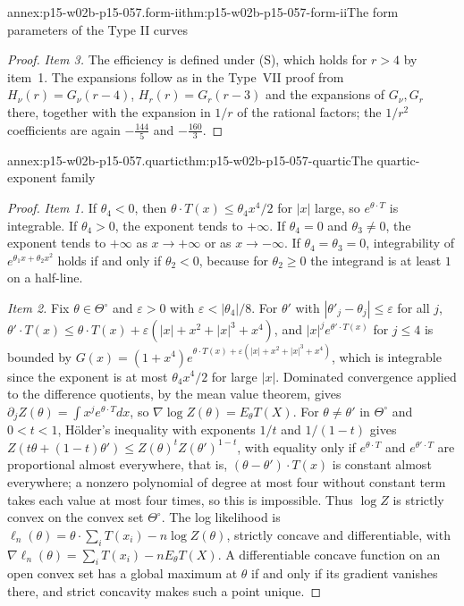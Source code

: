 \begin{annexitem}{annex:p15-w02b-p15-057.form-ii}{thm:p15-w02b-p15-057-form-ii}{The form parameters of the Type II curves}
\begin{proof}
\emph{Item 3.} The efficiency is defined under (S), which holds for
\(r>4\) by item~1. The expansions follow as in the Type~VII proof from
\(H_\nu(r)=G_\nu(r-4)\), \(H_r(r)=G_r(r-3)\) and the expansions of
\(G_\nu,G_r\) there, together with the expansion in \(1/r\) of the
rational factors; the \(1/r^2\) coefficients are again \(-\frac{144}5\)
and \(-\frac{160}3\).
\end{proof}
\end{annexitem}

\begin{annexitem}{annex:p15-w02b-p15-057.quartic}{thm:p15-w02b-p15-057-quartic}{The quartic-exponent family}
\begin{proof}
\emph{Item 1.} If \(\theta_4<0\), then
\(\theta\cdot T(x)\leq\theta_4x^4/2\) for \(|x|\) large, so
\(e^{\theta\cdot T}\) is integrable. If \(\theta_4>0\), the exponent tends
to \(+\infty\). If \(\theta_4=0\) and \(\theta_3\neq0\), the exponent tends
to \(+\infty\) as \(x\to+\infty\) or as \(x\to-\infty\). If
\(\theta_4=\theta_3=0\), integrability of \(e^{\theta_1x+\theta_2x^2}\)
holds if and only if \(\theta_2<0\), because for \(\theta_2\geq0\) the
integrand is at least \(1\) on a half-line.

\emph{Item 2.} Fix \(\theta\in\Theta^\circ\) and \(\varepsilon>0\) with
\(\varepsilon<|\theta_4|/8\). For \(\theta'\) with
\(|\theta'_j-\theta_j|\leq\varepsilon\) for all \(j\),
\(\theta'\cdot T(x)\leq\theta\cdot T(x)+\varepsilon(|x|+x^2+|x|^3+x^4)\),
and \(|x|^je^{\theta'\cdot T(x)}\) for \(j\leq4\) is bounded by
\(G(x)=(1+x^4)e^{\theta\cdot T(x)+\varepsilon(|x|+x^2+|x|^3+x^4)}\), which
is integrable since the exponent is at most \(\theta_4x^4/2\) for large
\(|x|\). Dominated convergence applied to the difference quotients, by the
mean value theorem, gives \(\partial_jZ(\theta)=\int x^je^{\theta\cdot
T}dx\), so \(\nabla\log Z(\theta)=E_\theta T(X)\). For
\(\theta\neq\theta'\) in \(\Theta^\circ\) and \(0<t<1\), Hölder's
inequality with exponents \(1/t\) and \(1/(1-t)\) gives
\(Z(t\theta+(1-t)\theta')\leq Z(\theta)^tZ(\theta')^{1-t}\), with equality
only if \(e^{\theta\cdot T}\) and \(e^{\theta'\cdot T}\) are proportional
almost everywhere, that is, \((\theta-\theta')\cdot T(x)\) is constant
almost everywhere; a nonzero polynomial of degree at most four without
constant term takes each value at most four times, so this is impossible.
Thus \(\log Z\) is strictly convex on the convex set \(\Theta^\circ\). The
log likelihood is \(\ell_n(\theta)=\theta\cdot\sum_iT(x_i)-n\log
Z(\theta)\), strictly concave and differentiable, with
\(\nabla\ell_n(\theta)=\sum_iT(x_i)-nE_\theta T(X)\). A differentiable
concave function on an open convex set has a global maximum at \(\theta\)
if and only if its gradient vanishes there, and strict concavity makes
such a point unique.


\end{proof}
\end{annexitem}
